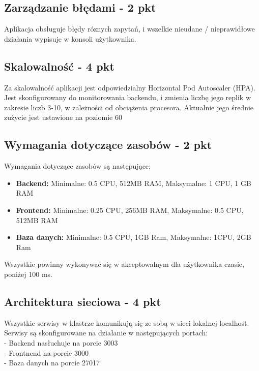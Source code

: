 \documentclass[12pt,a4paper]{article}
\begin{document}
\subsection{Zarządzanie błędami - 2 pkt}
Aplikacja obsługuje błędy róznych zapytań, i wszelkie nieudane / nieprawidłowe działania wypisuje w konsoli użytkownika.
\label{sec:ERD} 

\subsection{Skalowalność - 4 pkt}
\label{sec:ExamplesSection}
Za skalowalność aplikacji jest odpowiedzialny Horizontal Pod Autoscaler (HPA). Jest skonfigurowany do monitorowania backendu, i zmienia liczbę jego replik w zakresie liczb 3-10, w zależności od obciążenia procesora. Aktualnie jego średnie zużycie jest ustawione na poziomie 60%

\subsection{Wymagania dotyczące zasobów - 2 pkt}
\label{sec:ExampleTables}
Wymagania dotyczące zasobów są następujące:
\begin{itemize}
    \item \textbf{Backend:} Minimalne: 0.5 CPU, 512MB RAM, Maksymalne: 1 CPU, 1 GB RAM
    \item \textbf{Frontend:} Minimalne: 0.25 CPU, 256MB RAM, Maksymalne: 0.5 CPU, 512MB RAM
    \item \textbf{Baza danych:} Minimalne: 0.5 CPU, 1GB Ram,
    Maksymalne: 1CPU, 2GB Ram
\end{itemize}
Wszystkie powinny wykonywać się w akceptowalnym dla użytkownika czasie, poniżej 100 ms.

\subsection{Architektura sieciowa - 4 pkt}
\label{sec:ExampleResults}
Wszystkie serwisy w klastrze komunikują się ze sobą w sieci lokalnej localhost. Serwisy są skonfigurowane na działanie w następujących portach:\\
- Backend nasłuchuje na porcie 3003\\
- Frontnend na porcie 3000\\
- Baza danych na porcie 27017
\noindent



\nocite{*}
\end{document}

